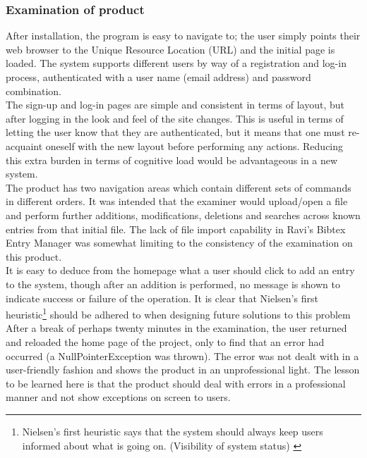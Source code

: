 \documentclass{l4proj}
\begin{document}
\subsubsection{Examination of product}
After installation, the program is easy to navigate to; the user simply points their web browser to the Unique Resource Location (URL) and the initial page is loaded. The system supports different users by way of a registration and log-in process, authenticated with a user name (email address) and password combination.\\

The sign-up and log-in pages are simple and consistent in terms of layout, but after logging in the look and feel of the site changes.  This is useful in terms of letting the user know that they are authenticated, but it means that one must re-acquaint oneself with the new layout before performing any actions.  Reducing this extra burden in terms of cognitive load would be advantageous in a new system.\\

The product has two navigation areas which contain different sets of commands in different orders. 
It was intended that the examiner would upload/open a file and perform further additions, modifications, deletions and searches across known entries from that initial file.  The lack of file import capability in Ravi's Bibtex Entry Manager was somewhat limiting to the consistency of the examination on this product. \\

It is easy to deduce from the homepage what a user should click to add an entry to the system, though after an addition is performed, no message is shown to indicate success or failure of the operation.  It is clear that Nielsen's first heuristic\footnote{\label{nielsenH1} Nielsen's first heuristic says that the system should always keep users informed about what is going on. (Visibility of system status) \cite{NielsenHeuristics}} should be adhered to when designing future solutions to this problem 
After a break of perhaps twenty minutes in the examination, the user returned and reloaded the home page of the project, only to find that an error had occurred (a NullPointerException was thrown).  The error was not dealt with in a user-friendly fashion and shows the product in an unprofessional light.  The lesson to be learned here is that the product should deal with errors in a professional manner and not show exceptions on screen to users.\\
\end{document}
